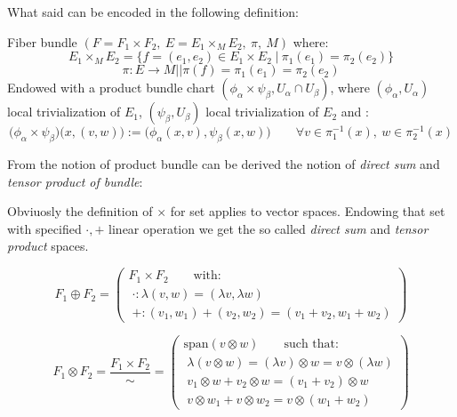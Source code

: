 \documentclass[a4paper,12pt]{scrartcl}    %
\begin{document}
What said can be encoded in the following definition:
\begin{definition}
Fiber bundle $( F= F_1 \times F_2 ,\: E = E_1 \times_M E_2, \: \pi ,\: M ) $ where:
$$ E_1 \times_M E_2 = \big\{ f = (e_1, e_2) \in E_1 \times E_2 \; \vert \: \pi_1(e_1) = \pi_2 (e_2) \big\}$$
$$ \pi : E \rightarrow M \vert \vert \pi (f) = \pi_1(e_1) = \pi_2(e_2)  $$
Endowed with a product bundle chart $( \phi_\alpha \times \psi_\beta , U_\alpha \cap U_\beta )$, where $(\phi_\alpha, U_\alpha)$ local trivialization of $E_1$, $(\psi_\beta, U_\beta)$ local trivialization of $E_2$ and :
\begin{displaymath}
\big(\phi_\alpha \times \psi_\beta \big) \big( x, (v,w) \big) := \big( \phi_\alpha (x,v) , \psi_{\beta}(x,w) \big) \qquad \forall v \in \pi_1^{-1}(x) ,\: w \in \pi_2^{-1}(x)
\end{displaymath}
\end{definition}

From the notion of product bundle can be derived the notion of \emph{direct sum} and \emph{tensor product of bundle}:

\begin{observation}
	Obviuosly the definition of $\times$ for set applies to vector spaces.
	Endowing that set with specified $\cdot, +$ linear operation we get the so called \emph{direct sum} and 		\emph{tensor product} spaces.

\begin{displaymath}
F_1 \oplus F_2 =\left(
                \begin{array}{ll}
                  F_1 \times F_2  \qquad \textrm{with:}\\
				  \; \cdot : \lambda (v,w) = (\lambda v , \lambda w )\\
				  \; + : (v_1,w_1) + (v_2,w_2) = ( v_1 + v_2 , w_1 + w_2)
                \end{array}
                \right)
\end{displaymath}

\begin{displaymath}
F_1 \otimes F_2 =\frac{F_1 \times F_2}{\sim} =\left( 
                \begin{array}{ll}
                  \textrm{span}( v\otimes w) \qquad \textrm{such that:}\\
				  \; \lambda (v \otimes w) = (\lambda v) \otimes w = v \otimes (\lambda w )\\
				  \; v_1 \otimes w + v_2 \otimes w = ( v_1 + v_2 ) \otimes w \\
				  \; v \otimes w_1 + v \otimes w_2 = v \otimes (w_1 + w_2)
                \end{array}
                \right)
\end{displaymath}
\end{observation}
\end{document}
